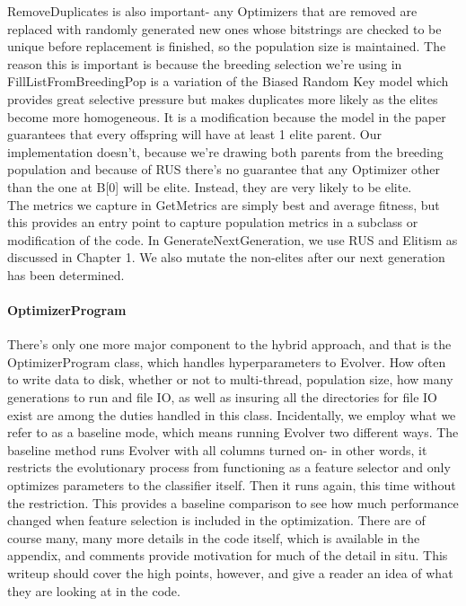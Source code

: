 RemoveDuplicates is also important- any Optimizers that are removed are replaced with randomly generated new ones whose bitstrings are checked to be unique before replacement is finished, so the population size is maintained.  The reason this is important is because the breeding selection we're using in FillListFromBreedingPop is a variation of the Biased Random Key model \cite{ruiz_biased_2015} which provides great selective pressure but makes duplicates more likely as the elites become more homogeneous.  It is a modification because the model in the paper guarantees that every offspring will have at least 1 elite parent.  Our implementation doesn't, because we're drawing both parents from the breeding population and because of RUS there's no guarantee that any Optimizer other than the one at B[0] will be elite.  Instead, they are very likely to be elite.\\
The metrics we capture in GetMetrics are simply best and average fitness, but this provides an entry point to capture population metrics in a subclass or modification of the code.  In GenerateNextGeneration, we use RUS and Elitism as discussed in Chapter 1.  We also mutate the non-elites after our next generation has been determined.
\paragraph{OptimizerProgram}
There's only one more major component to the hybrid approach, and that is the OptimizerProgram class, which handles hyperparameters to Evolver.  How often to write data to disk, whether or not to multi-thread, population size, how many generations to run and file IO, as well as insuring all the directories for file IO exist are among the duties handled in this class.  Incidentally, we employ what we refer to as a baseline mode, which means running Evolver two different ways.  The baseline method runs Evolver with all columns turned on- in other words, it restricts the evolutionary process from functioning as a feature selector and only optimizes parameters to the classifier itself.  Then it runs again, this time without the restriction.  This provides a baseline comparison to see how much performance changed when feature selection is included in the optimization.
There are of course many, many more details in the code itself, which is available in the appendix, and comments provide motivation for much of the detail in situ.  This writeup should cover the high points, however, and give a reader an idea of what they are looking at in the code.
